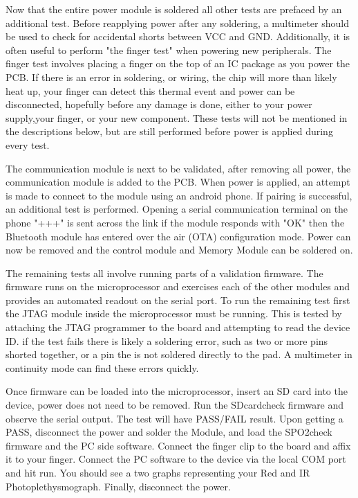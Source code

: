Now that the entire power module is soldered all other tests are prefaced by an additional test. Before reapplying power after any soldering, a multimeter should be used to check for accidental shorts between VCC and GND. Additionally, it is often useful to perform "the finger test" when powering new peripherals. The finger test involves placing a finger on the top of an IC package as you power the PCB. If there is an error in soldering, or wiring, the chip will more than likely heat up, your finger can detect this thermal event and power can be disconnected, hopefully before any damage is done, either to your power supply,your finger, or your new component. These tests will not be mentioned in the descriptions below, but are still performed before power is applied during every test.

The communication module is next to be validated, after removing all power, the communication module is added to the PCB. When power is applied, an attempt is made to connect to the module using an android phone. If pairing is successful, an additional test is performed. Opening a serial communication terminal on the phone "+++" is sent across the link if the module responds with "OK" then the Bluetooth module has entered over the air (OTA) configuration mode. Power can now be removed and the control module and Memory Module can be soldered on. 

The remaining tests all involve running parts of a validation firmware. The firmware runs on the microprocessor and exercises each of the other modules and provides an automated readout on the serial port. To run the remaining test first the JTAG module inside the microprocessor must be running. This is tested by attaching the JTAG programmer to the board and attempting to read the device ID. if the test fails there is likely a soldering error, such as two or more pins shorted together, or a pin the is not soldered directly to the pad. A multimeter in continuity mode can find these errors quickly. 

Once firmware can be loaded into the microprocessor, insert an SD card into the device, power does not need to be removed. Run the SDcardcheck firmware and observe the serial output. The test will have PASS/FAIL result. Upon getting a PASS, disconnect the power and solder the  Module, and load the SPO2check firmware and the PC side software. Connect the finger clip to the board and affix it to your finger. Connect the PC software to the device via the local COM port and hit run. You should see a two graphs representing your Red and IR Photoplethysmograph. Finally, disconnect the power.

